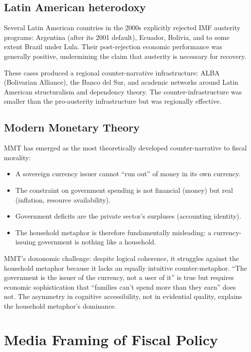 \subsection{Latin American heterodoxy}

Several Latin American countries in the 2000s explicitly rejected IMF austerity programs: Argentina (after its 2001 default), Ecuador, Bolivia, and to some extent Brazil under Lula.
Their post-rejection economic performance was generally positive, undermining the claim that austerity is necessary for recovery.

These cases produced a regional counter-narrative infrastructure: ALBA (Bolivarian Alliance), the Banco del Sur, and academic networks around Latin American structuralism and dependency theory.
The counter-infrastructure was smaller than the pro-austerity infrastructure but was regionally effective.

\subsection{Modern Monetary Theory}

MMT has emerged as the most theoretically developed counter-narrative to fiscal morality:
\begin{itemize}[nosep]
  \item A sovereign currency issuer cannot ``run out'' of money in its own currency.
  \item The constraint on government spending is not financial (money) but real (inflation, resource availability).
  \item Government deficits are the private sector's surpluses (accounting identity).
  \item The household metaphor is therefore fundamentally misleading: a currency-issuing government is nothing like a household.
\end{itemize}

MMT's doxonomic challenge: despite logical coherence, it struggles against the household metaphor because it lacks an equally intuitive counter-metaphor.
``The government is the issuer of the currency, not a user of it'' is true but requires economic sophistication that ``families can't spend more than they earn'' does not.
The asymmetry in cognitive accessibility, not in evidential quality, explains the household metaphor's dominance.

\section{Media Framing of Fiscal Policy}
\label{sec:ch25-media}

